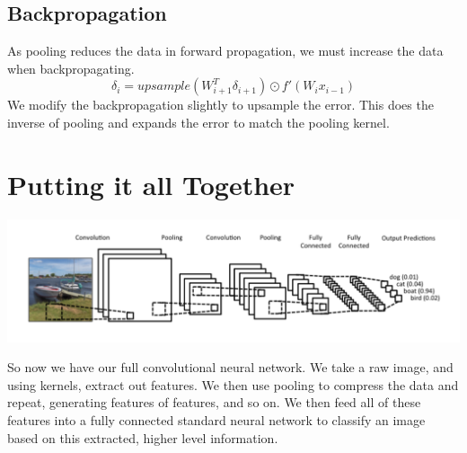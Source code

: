\documentclass{exam}
\begin{document}
\subsection{Backpropagation}
As pooling reduces the data in forward propagation, we must increase the data when backpropagating.
\[\delta_i = upsample(W_{i+1}^T\delta_{i+1}) \odot f'(W_ix_{i-1})\]
We modify the backpropagation slightly to upsample the error. This does the inverse of pooling and expands the error to match the pooling kernel.

\section{Putting it all Together}
\begin{center}
\includegraphics[scale=0.5]{fullstructure}
\end{center}
So now we have our full convolutional neural network. We take a raw image, and using kernels, extract out features. We then use pooling to compress the data and repeat, generating features of features, and so on. We then feed all of these features into a fully connected standard neural network to classify an image based on this extracted, higher level information.
\end{document}
